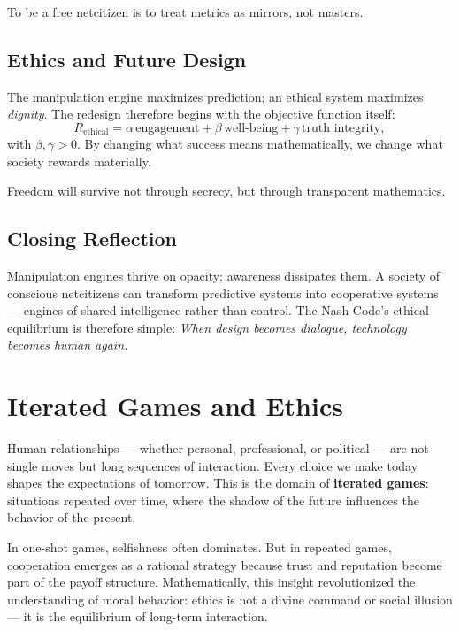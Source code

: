 \documentclass[12pt,twoside]{book}
\begin{document}
\begin{keyidea}
 To be a free netcitizen is to treat metrics as mirrors, not masters.
\end{keyidea}


\section{Ethics and Future Design}

The manipulation engine maximizes prediction; an ethical system maximizes \emph{dignity}.  
The redesign therefore begins with the objective function itself:
\[
R_{\text{ethical}} = \alpha\,\text{engagement} + \beta\,\text{well-being} + \gamma\,\text{truth integrity},
\]
with $\beta,\gamma>0$.  
By changing what success means mathematically, we change what society rewards materially.\\

\begin{keyidea}
Freedom will survive not through secrecy, but through transparent mathematics.
\end{keyidea}

\section{Closing Reflection}

Manipulation engines thrive on opacity; awareness dissipates them.  
A society of conscious netcitizens can transform predictive systems into cooperative systems — engines of shared intelligence rather than control.  
The Nash Code’s ethical equilibrium is therefore simple:  
\emph{When design becomes dialogue, technology becomes human again.}

\chapter{Iterated Games and Ethics}

Human relationships --- whether personal, professional, or political --- are not single moves but long sequences of interaction.  
Every choice we make today shapes the expectations of tomorrow.  
This is the domain of \textbf{iterated games}: situations repeated over time, where the shadow of the future influences the behavior of the present.  

In one-shot games, selfishness often dominates.  
But in repeated games, cooperation emerges as a rational strategy because trust and reputation become part of the payoff structure.  
Mathematically, this insight revolutionized the understanding of moral behavior:  
ethics is not a divine command or social illusion --- it is the equilibrium of long-term interaction.
\end{document}
